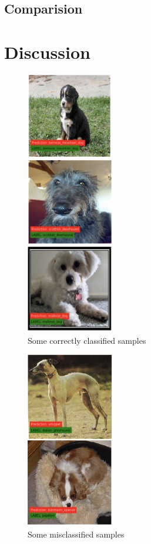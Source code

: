 \documentclass{article}
\begin{document}
\subsection{Comparision}

\newpage
\section{Discussion}
\begin{figure}[H]
	\centering
	\includegraphics[width=1.5in]{pics/correct_samples} 
	\caption{Some correctly classified samples}
\end{figure}
\begin{figure}[H]
	\centering
	\includegraphics[width=1.5in]{pics/wrong_samples} 
	\caption{Some misclassified samples}
	
\end{figure}
\end{document}
